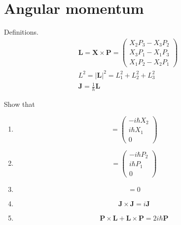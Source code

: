 

\section*{Angular momentum}

Definitions.
\begin{gather*}
\mathbf L=\mathbf X\times\mathbf P
=\begin{pmatrix}
X_2P_3-X_3P_2
\\
X_3P_1-X_1P_3
\\
X_1P_2-X_2P_1
\end{pmatrix}
\\[1ex]
L^2=|\mathbf L|^2=L_1^2+L_2^2+L_3^2
\\[1ex]
\mathbf J=\frac{1}{\hbar}\mathbf L
\end{gather*}

Show that

\begin{enumerate}

\item
\begin{equation*}
[\mathbf X,L_3]
=\begin{pmatrix}
-i\hbar X_2
\\
i\hbar X_1
\\
0
\end{pmatrix}
\end{equation*}

\item
\begin{equation*}
[\mathbf P,L_3]
=\begin{pmatrix}
-i\hbar P_2
\\
i\hbar P_1
\\
0
\end{pmatrix}
\end{equation*}

\item
\begin{equation*}
[\mathbf L,L^2]=0
\end{equation*}

\item
\begin{equation*}
\mathbf J\times\mathbf J=i\mathbf J
\end{equation*}

\item
\begin{equation*}
\mathbf P\times\mathbf L+\mathbf L\times\mathbf P=2i\hbar\mathbf P
\end{equation*}

\end{enumerate}


